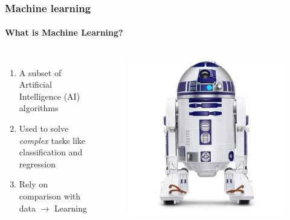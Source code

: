 \documentclass[aspectratio=43]{beamer}
\begin{document}
\begin{frame}

	\frametitle{Machine learning}
	\framesubtitle{What is Machine Learning?}
	\begin{columns}
		
		
		\begin{enumerate}
			\item A subset of Artificial Intelligence (AI) algorithms 
			\item Used to solve \textit{complex} tasks like classification and regression
			\item Rely on comparison with data $\longrightarrow$ {\color{red}Learning}
		\end{enumerate}
		
		\begin{figure}[!htb]
			\includegraphics[width = \linewidth]{plots/r2d2.jpeg}
		\end{figure}
	
	\end{columns}

\end{frame}
\end{document}

